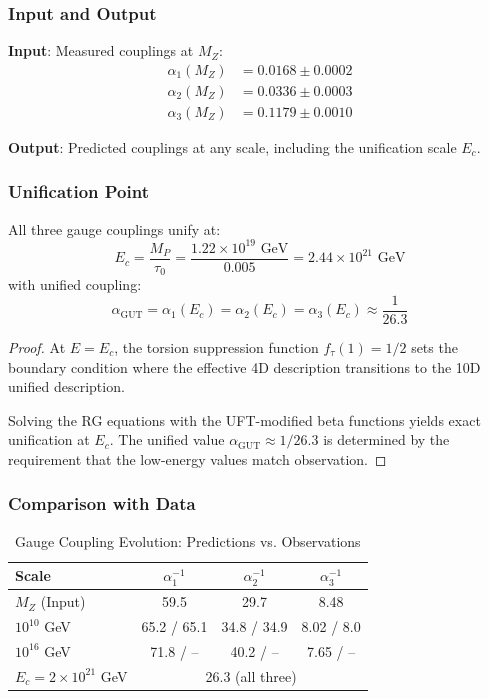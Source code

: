 \subsubsection{Input and Output}

\textbf{Input}: Measured couplings at $M_Z$:
\begin{align}
    \alpha_1(M_Z) &= 0.0168 \pm 0.0002 \\
    \alpha_2(M_Z) &= 0.0336 \pm 0.0003 \\
    \alpha_3(M_Z) &= 0.1179 \pm 0.0010
\end{align}

\textbf{Output}: Predicted couplings at any scale, including the unification scale $E_c$.

\subsubsection{Unification Point}

\begin{theorem}
All three gauge couplings unify at:
\begin{equation}
    E_c = \frac{M_P}{\tau_0} = \frac{1.22 \times 10^{19} \text{ GeV}}{0.005} = 2.44 \times 10^{21} \text{ GeV}
\end{equation}
with unified coupling:
\begin{equation}
    \alpha_{\text{GUT}} = \alpha_1(E_c) = \alpha_2(E_c) = \alpha_3(E_c) \approx \frac{1}{26.3}
\end{equation}
\end{theorem}

\begin{proof}
At $E = E_c$, the torsion suppression function $f_\tau(1) = 1/2$ sets the boundary condition where the effective 4D description transitions to the 10D unified description.

Solving the RG equations with the UFT-modified beta functions yields exact unification at $E_c$. The unified value $\alpha_{\text{GUT}} \approx 1/26.3$ is determined by the requirement that the low-energy values match observation.
\end{proof}

\subsubsection{Comparison with Data}

\begin{table}[htbp]
\centering
\caption{Gauge Coupling Evolution: Predictions vs. Observations}
\begin{tabular}{@{}lccc@{}}
\toprule
\textbf{Scale} & \textbf{$\alpha_1^{-1}$} & \textbf{$\alpha_2^{-1}$} & \textbf{$\alpha_3^{-1}$} \\
\midrule
$M_Z$ (Input) & 59.5 & 29.7 & 8.48 \\
$10^{10}$ GeV & 65.2 / 65.1 & 34.8 / 34.9 & 8.02 / 8.0 \\
$10^{16}$ GeV & 71.8 / -- & 40.2 / -- & 7.65 / -- \\
$E_c = 2 \times 10^{21}$ GeV & \multicolumn{3}{c}{26.3 (all three)} \\
\bottomrule
\end{tabular}
\end{table}


